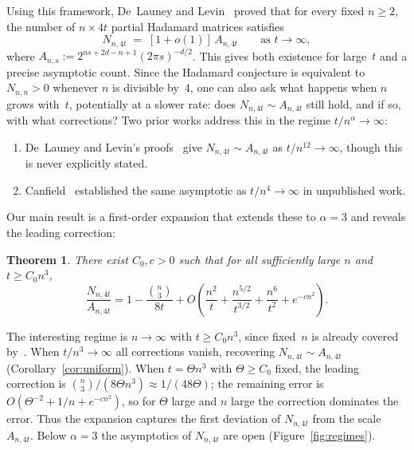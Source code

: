\documentclass[11pt]{article}
\newtheorem{theorem}{Theorem}[section]
\theoremstyle{definition}
\begin{document}
Using this framework, De~Launey and Levin~\cite[Theorem~2]{DL10} proved that for every fixed \(n\ge 2\), the number of \(n\times 4t\) partial Hadamard matrices satisfies
\begin{equation}\label{eq:fixed-n}
  N_{n,4t} \;=\; [1+o(1)]\,A_{n,4t}
  \qquad\text{as } t\to\infty,
\end{equation}
where \(A_{n,s}:=2^{ns+2d-n+1}(2\pi s)^{-d/2}\).
This gives both existence for large~\(t\) and a precise asymptotic count. Since the Hadamard conjecture is equivalent to \(N_{n,n}>0\) whenever $n$ is divisible by~$4$, one can also ask what happens when \(n\) grows with~\(t\), potentially at a slower rate: does \(N_{n,4t}\sim A_{n,4t}\) still hold, and if so, with what corrections? Two prior works address this in the regime \(t/n^\alpha\to\infty\):
\begin{enumerate}[label=(\roman*),nosep]
\item De~Launey and Levin's proofs~\cite[Theorem~4.1]{DL10} give \(N_{n,4t}\sim A_{n,4t}\) as \(t/n^{12}\to\infty\), though this is never explicitly stated.
\item Canfield~\cite{Can} established the same asymptotic as \(t/n^4\to\infty\) in unpublished work.
\end{enumerate}

Our main result is a first-order expansion that extends these to \(\alpha=3\) and reveals the leading correction:

\begin{theorem}\label{thm:main-intro}
There exist \(C_0,c>0\) such that for all sufficiently large \(n\) and \(t\ge C_0 n^3\),
\[
  \frac{N_{n,4t}}{A_{n,4t}}
  =1-\frac{\binom{n}{3}}{8t}
  +O\!\left(\frac{n^2}{t}+\frac{n^{5/2}}{t^{3/2}}+\frac{n^6}{t^2}+e^{-cn^2}\right).
\]
\end{theorem}

\noindent The interesting regime is \(n\to\infty\) with \(t\ge C_0 n^3\), since fixed~\(n\) is already covered by~\cite{DL10}. When \(t/n^3\to\infty\) all corrections vanish, recovering \(N_{n,4t}\sim A_{n,4t}\) (Corollary~\ref{cor:uniform}). When \(t=\Theta n^3\) with \(\Theta\ge C_0\) fixed, the leading correction is \(\binom{n}{3}/(8\Theta n^3)\approx 1/(48\Theta)\); the remaining error is \(O(\Theta^{-2}+1/n+e^{-cn^2})\), so for \(\Theta\) large and \(n\) large the correction dominates the error. Thus the expansion captures the first deviation of \(N_{n,4t}\) from the scale~\(A_{n,4t}\). Below \(\alpha=3\) the asymptotics of \(N_{n,4t}\) are open (Figure~\ref{fig:regimes}).
\end{document}
